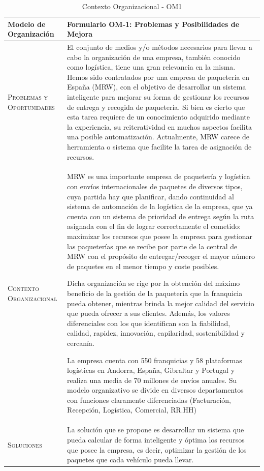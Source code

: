 \begin{table}[H]
\scriptsize
\begin{tabularx}{\textwidth}{|l|X|} \hline
\textbf{Modelo de Organización} & \textbf{Formulario OM-1: Problemas y Posibilidades de Mejora} \\ \hline\hline

\textsc{Problemas y Oportunidades} & El conjunto de medios y/o métodos necesarios para llevar a cabo la organización de una empresa, también conocido como logística, tiene una gran relevancia en la misma. Hemos sido contratados por una empresa de paquetería en España (MRW), con el objetivo de desarrollar un sistema inteligente para mejorar su forma de gestionar los recursos de entrega y recogida de paquetería. Si bien es cierto que esta tarea requiere de un conocimiento adquirido mediante la experiencia, su reiteratividad en muchos aspectos facilita una posible automatización. Actualmente, MRW carece de herramienta o sistema que facilite la tarea de asignación de recursos. \\ \hline
\textsc{Contexto Organizacional} & 
MRW es una importante empresa de paquetería y logística con envíos internacionales de paquetes de diversos tipos, cuya partida hay que planificar, dando continuidad al sistema de automación de la logística de la empresa, que ya cuenta con un sistema de prioridad de entrega según la ruta asignada con el fin de lograr correctamente el cometido: maximizar los recursos que posee la empresa para gestionar las paqueterías que se recibe por parte de la central de MRW con el propósito de entregar/recoger el mayor número de paquetes en el menor tiempo y coste posibles. 

Dicha organización se rige por la obtención del máximo beneficio de la gestión de la paquetería que la franquicia pueda obtener, mientras brinda la mejor calidad del servicio que pueda ofrecer a sus clientes. Además, los valores diferenciales 
con los que identifican son la fiabilidad, calidad, rapidez, innovación, capilaridad, sostenibilidad y cercanía.

La empresa cuenta con 550 franquicias y 58 plataformas logísticas en Andorra, España, Gibraltar y Portugal y realiza una media de 70 millones de envíos anuales. Su modelo organizativo se divide en diversos departamentos con funciones claramente diferenciadas (Facturación, Recepción, Logística, Comercial, RR.HH)\\ \hline
\textsc{Soluciones} & La solución que se propone es desarrollar un sistema que pueda calcular de forma inteligente y óptima los recursos que posee la empresa, es decir, optimizar la gestión de los paquetes que cada vehículo pueda llevar.\\
\hline
\end{tabularx}
  \caption{\label{tab:OM1}Contexto Organizacional - OM1}
\end{table}
	
